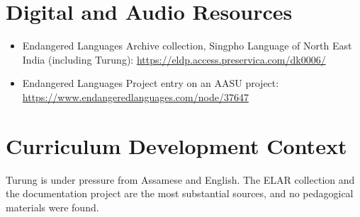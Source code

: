 \documentclass[12pt]{article}
\begin{document}
\section{Digital and Audio Resources}
\begin{itemize}
\item Endangered Languages Archive collection, Singpho Language of North East India (including Turung): \url{https://eldp.access.preservica.com/dk0006/}
\item Endangered Languages Project entry on an AASU project: \url{https://www.endangeredlanguages.com/node/37647}
\end{itemize}
\section{Curriculum Development Context}
Turung is under pressure from Assamese and English. The ELAR collection and the documentation project are the most substantial sources, and no pedagogical materials were found.
\end{document}
